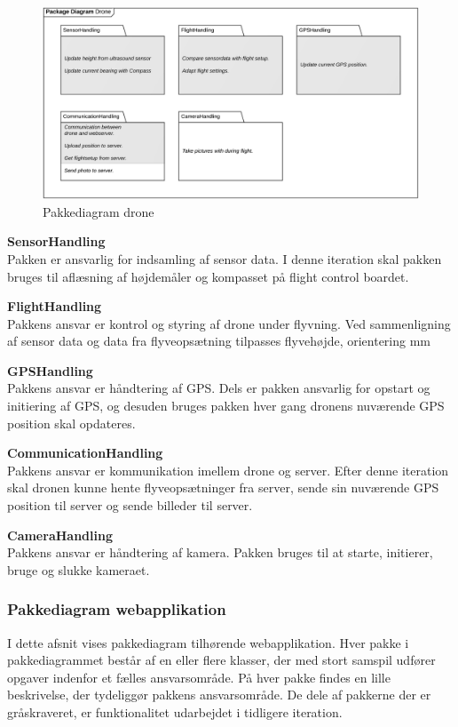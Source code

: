 \begin{figure}[H]
	\centering
	\includegraphics[width=1\textwidth]{Billeder/pakke_diagrammer/iteration3_drone.png}
	\vspace{-0.5cm}
	\caption{Pakkediagram drone}
	\label{fig:iteration2_pakke_diagram_drone}
\end{figure}

\textbf{SensorHandling}\\
Pakken er ansvarlig for indsamling af sensor data. I denne iteration skal pakken bruges til aflæsning af højdemåler og kompasset på flight control boardet. 

\textbf{FlightHandling}\\
Pakkens ansvar er kontrol og styring af drone under flyvning. Ved sammenligning af sensor data og data fra flyveopsætning tilpasses flyvehøjde, orientering mm

\textbf{GPSHandling}\\
Pakkens ansvar er håndtering af GPS. Dels er pakken ansvarlig for opstart og initiering af GPS, og desuden bruges pakken hver gang dronens nuværende GPS position skal opdateres.

\textbf{CommunicationHandling}\\
Pakkens ansvar er kommunikation imellem drone og server. Efter denne iteration skal dronen kunne hente flyveopsætninger fra server, sende sin nuværende GPS position til server og sende billeder til server.

\textbf{CameraHandling}\\
Pakkens ansvar er håndtering af kamera. Pakken bruges til at starte, initierer, bruge og slukke kameraet.


\newpage
\subsubsection*{Pakkediagram webapplikation}
I dette afsnit vises pakkediagram tilhørende webapplikation. Hver pakke i pakkediagrammet består af en eller flere klasser, der med stort samspil udfører opgaver indenfor et fælles ansvarsområde. 
På hver pakke findes en lille beskrivelse, der tydeliggør pakkens ansvarsområde. De dele af pakkerne der er gråskraveret, er funktionalitet udarbejdet i tidligere iteration. 

